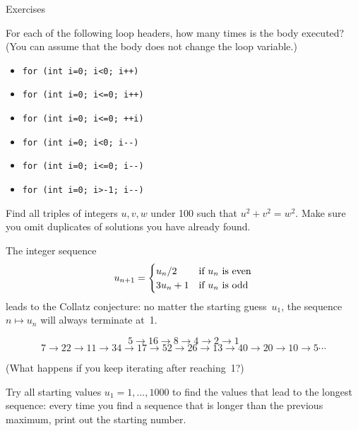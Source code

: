  {Exercises}

\begin{exercise}
  For each of the following loop headers, how many times is the body
  executed? (You can assume that the body does not change the loop variable.)
  \begin{itemize}
  \item 
\begin{verbatim}
for (int i=0; i<0; i++)
\end{verbatim}
  \item 
\begin{verbatim}
for (int i=0; i<=0; i++)
\end{verbatim}
  \item 
\begin{verbatim}
for (int i=0; i<=0; ++i)
\end{verbatim}
  \item 
\begin{verbatim}
for (int i=0; i<0; i--)
\end{verbatim}
  \item 
\begin{verbatim}
for (int i=0; i<=0; i--)
\end{verbatim}
  \item 
\begin{verbatim}
for (int i=0; i>-1; i--)
\end{verbatim}
  \end{itemize}
\end{exercise}

\begin{exercise}
  \label{ex:pythagoras}
  Find all triples of integers $u,v,w$ under 100 such that
  $u^2+v^2=w^2$. Make sure you omit duplicates of solutions you have
  already found.
\end{exercise}

\begin{exercise}
  \label{ex:collatz}
  The integer sequence
  \[ u_{n+1} = 
  \begin{cases}
    u_n/2&\hbox{if $u_n$ is even}\\
    3u_n+1&\hbox{if $u_n$ is odd}\\
  \end{cases}
  \]
  leads to the Collatz conjecture: no matter the starting guess~$u_1$,
  the sequence $n\mapsto u_n$ will always terminate at~1.

  { \small
  \[ 5\rightarrow 16\rightarrow 8\rightarrow 4\rightarrow 2\rightarrow 1\]
  \[ 7\rightarrow 22\rightarrow 11\rightarrow 34\rightarrow
  17\rightarrow 52\rightarrow 26\rightarrow 13\rightarrow
  40\rightarrow 20\rightarrow 10\rightarrow 5\cdots \]
  }

  (What happens if you keep iterating after reaching~1?)
  
  Try all starting values $u_1=1,\ldots,1000$ to find the values that
  lead to the longest sequence: every time you find a sequence that is
  longer than the previous maximum, print out the starting number.
\end{exercise}

